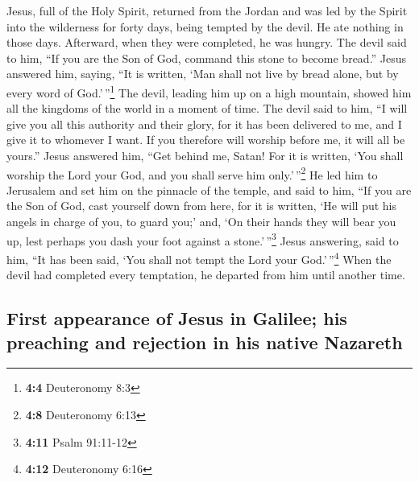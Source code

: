  Jesus, full of the Holy Spirit, returned from the Jordan
and was led by the Spirit into the wilderness  for forty
days, being tempted by the devil. He ate nothing in those days.
Afterward, when they were completed, he was hungry.  The
devil said to him, ``If you are the Son of God, command this stone to
become bread.''  Jesus answered him, saying, ``It is
written, `Man shall not live by bread alone, but by every word of
God.'\,''\footnote{\textbf{4:4} Deuteronomy 8:3}  The
devil, leading him up on a high mountain, showed him all the kingdoms of
the world in a moment of time.  The devil said to him, ``I
will give you all this authority and their glory, for it has been
delivered to me, and I give it to whomever I want.  If you
therefore will worship before me, it will all be yours.'' 
Jesus answered him, ``Get behind me, Satan! For it is written, `You
shall worship the Lord your God, and you shall serve him
only.'\,''\footnote{\textbf{4:8} Deuteronomy 6:13}  He led
him to Jerusalem and set him on the pinnacle of the temple, and said to
him, ``If you are the Son of God, cast yourself down from here,
 for it is written, `He will put his angels in charge of
you, to guard you;'  and, `On their hands they will bear
you up, lest perhaps you dash your foot against a stone.'\,''\footnote{\textbf{4:11}
  Psalm 91:11-12}  Jesus answering, said to him, ``It has
been said, `You shall not tempt the Lord your God.'\,''\footnote{\textbf{4:12}
  Deuteronomy 6:16}  When the devil had completed every
temptation, he departed from him until another time.

\hypertarget{first-appearance-of-jesus-in-galilee-his-preaching-and-rejection-in-his-native-nazareth}{%
\subsection{First appearance of Jesus in Galilee; his preaching and
rejection in his native
Nazareth}\label{first-appearance-of-jesus-in-galilee-his-preaching-and-rejection-in-his-native-nazareth}}

